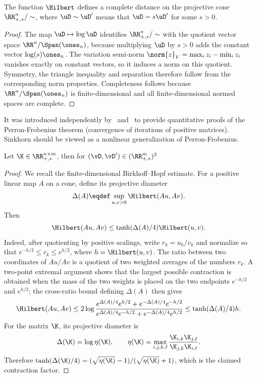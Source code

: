 \begin{prop}
	The function $\Hilbert$ defines a complete distance on the projective cone $\RR_{+,*}^n/\sim$, where $\uD \sim \uD'$ means that $\uD=s\uD'$ for some $s>0$.
\end{prop}
\begin{proof}
	The map $\uD \mapsto \log \uD$ identifies $\RR_{+,*}^n/\sim$ with the quotient vector space $\RR^n/\Span(\ones_n)$, because multiplying $\uD$ by $s>0$ adds the constant vector $\log(s)\ones_n$. The variation semi-norm $\norm{z}_V=\max_i z_i-\min_i z_i$ vanishes exactly on constant vectors, so it induces a norm on this quotient. Symmetry, the triangle inequality and separation therefore follow from the corresponding norm properties. Completeness follows because $\RR^n/\Span(\ones_n)$ is finite-dimensional and all finite-dimensional normed spaces are complete.
\end{proof}
%
It was introduced independently by~\cite{birkhoff1957extensions} and~\cite{samelson1957perron} to provide quantitative proofs of the Perron-Frobenius theorem (convergence of iterations of positive matrices). Sinkhorn should be viewed as a nonlinear generalization of Perron-Frobenius.


\begin{thm}\label{thm-birkhoff}
	Let $\K \in \RR_{+,*}^{n \times m}$, then for $(\vD,\vD') \in (\RR_{+,*}^m)^2$
\end{thm}
\begin{proof}
	We recall the finite-dimensional Birkhoff--Hopf estimate. For a positive linear map $A$ on a cone, define its projective diameter
	\[
		\Delta(A) \eqdef \sup_{u,v>0} \Hilbert(Au,Av).
	\]
	Then
	\[
		\Hilbert(Au,Av) \leq \tanh(\Delta(A)/4)\Hilbert(u,v).
	\]
	Indeed, after quotienting by positive scalings, write $r_k=u_k/v_k$ and normalize so that $e^{-h/2}\leq r_k\leq e^{h/2}$, where $h=\Hilbert(u,v)$. The ratio between two coordinates of $Au/Av$ is a quotient of two weighted averages of the numbers $r_k$. A two-point extremal argument shows that the largest possible contraction is obtained when the mass of the two weights is placed on the two endpoints $e^{-h/2}$ and $e^{h/2}$; the cross-ratio bound defining $\Delta(A)$ then gives
	\[
		\Hilbert(Au,Av)
		\leq
		2\log\frac{e^{\Delta(A)/4}e^{h/2}+e^{-\Delta(A)/4}e^{-h/2}}
		{e^{\Delta(A)/4}e^{-h/2}+e^{-\Delta(A)/4}e^{h/2}}
		\leq \tanh(\Delta(A)/4)h.
	\]
	For the matrix $\K$, its projective diameter is
	\[
		\Delta(\K)=\log \eta(\K),
		\qquad
		\eta(\K)=\max_{i,j,k,\ell}
		\frac{\K_{i,k}\K_{j,\ell}}{\K_{j,k}\K_{i,\ell}}.
	\]
	Therefore $\tanh(\Delta(\K)/4)=(\sqrt{\eta(\K)}-1)/(\sqrt{\eta(\K)}+1)$, which is the claimed contraction factor.
\end{proof}

